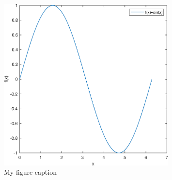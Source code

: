 \begin{figure}[h]\label{fig:example}
	\includegraphics[width=0.8\textwidth]{figures/graph.eps}
    \caption{My figure caption}
\end{figure}